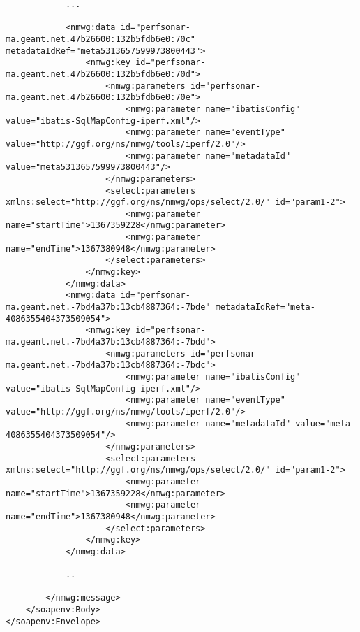\documentclass[a4paper,12pt,titlepage,hidelinks,fleqn]{article}
\begin{document}
\begin{flushleft}
\begin{framed}
\begin{lstlisting}
		 	...
		 	
			<nmwg:data id="perfsonar-ma.geant.net.47b26600:132b5fdb6e0:70c" metadataIdRef="meta5313657599973800443">
				<nmwg:key id="perfsonar-ma.geant.net.47b26600:132b5fdb6e0:70d">
					<nmwg:parameters id="perfsonar-ma.geant.net.47b26600:132b5fdb6e0:70e">
						<nmwg:parameter name="ibatisConfig" value="ibatis-SqlMapConfig-iperf.xml"/>
						<nmwg:parameter name="eventType" value="http://ggf.org/ns/nmwg/tools/iperf/2.0"/>
						<nmwg:parameter name="metadataId" value="meta5313657599973800443"/>
					</nmwg:parameters>
					<select:parameters xmlns:select="http://ggf.org/ns/nmwg/ops/select/2.0/" id="param1-2">
						<nmwg:parameter name="startTime">1367359228</nmwg:parameter>
						<nmwg:parameter name="endTime">1367380948</nmwg:parameter>
					</select:parameters>
				</nmwg:key>
			</nmwg:data>
			<nmwg:data id="perfsonar-ma.geant.net.-7bd4a37b:13cb4887364:-7bde" metadataIdRef="meta-4086355404373509054">
				<nmwg:key id="perfsonar-ma.geant.net.-7bd4a37b:13cb4887364:-7bdd">
					<nmwg:parameters id="perfsonar-ma.geant.net.-7bd4a37b:13cb4887364:-7bdc">
						<nmwg:parameter name="ibatisConfig" value="ibatis-SqlMapConfig-iperf.xml"/>
						<nmwg:parameter name="eventType" value="http://ggf.org/ns/nmwg/tools/iperf/2.0"/>
						<nmwg:parameter name="metadataId" value="meta-4086355404373509054"/>
					</nmwg:parameters>
					<select:parameters xmlns:select="http://ggf.org/ns/nmwg/ops/select/2.0/" id="param1-2">
						<nmwg:parameter name="startTime">1367359228</nmwg:parameter>
						<nmwg:parameter name="endTime">1367380948</nmwg:parameter>
					</select:parameters>
				</nmwg:key>
			</nmwg:data>
			
			..
			
		</nmwg:message>
	</soapenv:Body>
</soapenv:Envelope>
\end{lstlisting}
\end{framed}
\end{flushleft}
\end{document}
